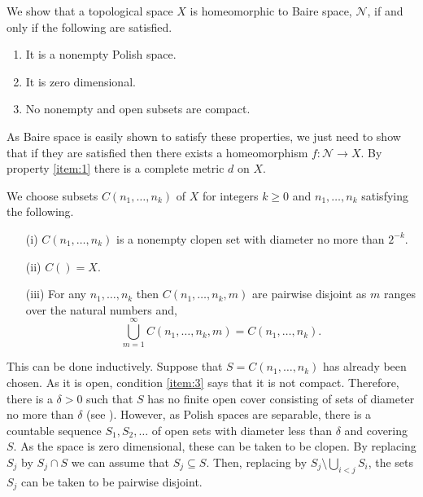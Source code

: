 \documentclass[12pt]{article}
\begin{document}

We show that a topological space $X$ is homeomorphic to Baire space, $\mathcal{N}$, if and only if the following are satisfied.
\begin{enumerate}
\item\label{item:1} It is a nonempty Polish space.
\item\label{item:2} It is zero dimensional.
\item\label{item:3} No nonempty and open subsets are compact.
\end{enumerate}
As Baire space is easily shown to satisfy these properties, we just need to show that if they are satisfied then there exists a homeomorphism $f\colon\mathcal{N}\rightarrow X$. By property \ref{item:1} there is a complete metric $d$ on $X$.

We choose subsets $C(n_1,\ldots,n_k)$ of $X$ for integers $k\ge 0$ and $n_1,\ldots,n_k$ satisfying the following.
\begin{enumerate}
\item[(i)] $C(n_1,\ldots,n_k)$ is a nonempty clopen set with diameter no more than $2^{-k}$.
\item[(ii)] $C()= X$.
\item[(iii)] For any $n_1,\ldots,n_k$ then $C(n_1,\ldots,n_k,m)$ are pairwise disjoint as $m$ ranges over the natural numbers and,
\begin{equation}\label{eq:1}
\bigcup_{m=1}^\infty C(n_1,\ldots,n_k,m)=C(n_1,\ldots,n_k).
\end{equation}
\end{enumerate}
This can be done inductively. Suppose that $S=C(n_1,\ldots,n_k)$ has already been chosen. As it is open, condition \ref{item:3} says that it is not compact. Therefore, there is a $\delta>0$ such that $S$ has no finite open cover consisting of sets of diameter no more than $\delta$ (see ).
However, as Polish spaces are separable, there is a countable sequence $S_1,S_2,\ldots$ of open sets with diameter less than $\delta$ and covering $S$.
As the space is zero dimensional, these can be taken to be clopen. By replacing $S_j$ by $S_j\cap S$ we can assume that $S_j\subseteq S$. Then, replacing by $S_j\setminus\bigcup_{i<j}S_i$, the sets $S_j$ can be taken to be pairwise disjoint.
\end{document}
